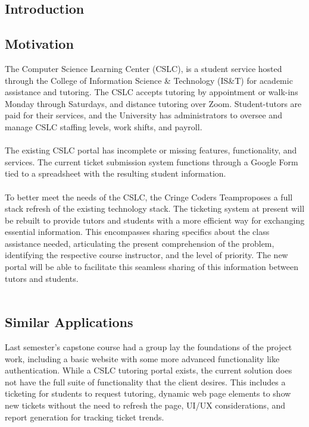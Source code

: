 \documentclass[oneside,openany,obeyspaces]{book}
\newcommand\tab[1][1cm]{\hspace*{#1}}
\newcommand\TeamName{Cringe Coders Team}
\begin{document}
\begin{flushleft}
    \chapter{Introduction}

    \section{Motivation} \label{sec:Motivation}

    \tab The Computer Science Learning Center (CSLC), is a student service hosted through the College of Information Science \& Technology (IS\&T) for academic assistance and tutoring. The CSLC accepts tutoring by appointment or walk-ins Monday through Saturdays, and distance tutoring over Zoom. Student-tutors are paid for their services, and the University has administrators to oversee and manage CSLC staffing levels, work shifts, and payroll.\\~\\

    \tab The existing CSLC portal has incomplete or missing features, functionality, and services. The current ticket submission system functions through a Google Form tied to a spreadsheet with the resulting student information.\\~\\

    \tab To better meet the needs of the CSLC, the \TeamName\space proposes a full stack refresh of the existing technology stack. The ticketing system at present will be rebuilt to provide tutors and students with a more efficient way for exchanging essential information. This encompasses sharing specifics about the class assistance needed, articulating the present comprehension of the problem, identifying the respective course instructor, and the level of priority. The new portal will be able to facilitate this seamless sharing of this information between tutors and students.\\~\\


    \section{Similar Applications}

    \tab Last semester's capstone course had a group lay the foundations of the project work, including a basic website with some more advanced functionality like authentication. While a CSLC tutoring portal exists, the current solution does not have the full suite of functionality that the client desires. This includes a ticketing for students to request tutoring, dynamic web page elements to show new tickets without the need to refresh the page, UI/UX considerations, and report generation for tracking ticket trends.\\~\\


\end{flushleft}
\end{document}
